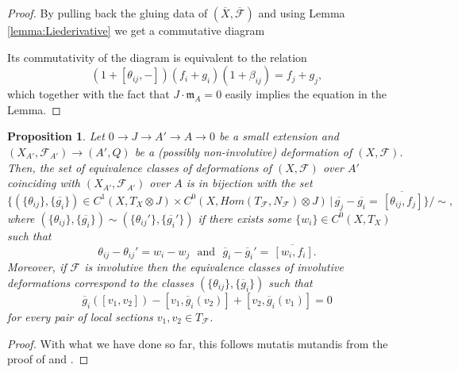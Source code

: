 \documentclass[reqno]{amsart}
\newcommand\m{\mathfrak{m}}
\newcommand{\T}{\mathbb{T}}
\newcommand{\F}{\mathscr{F}}
\newcounter{Theorem}
\newtheorem{proposition}[theorem]{Proposition}
\theoremstyle{definition}
\theoremstyle{named}
\begin{document}
\begin{proof}
By pulling back the gluing data of $(\overline{X},\overline{\F})$ and using  Lemma \ref{lemma:Liederivative} we get a commutative diagram
   
    \begin{center}\Large
    \end{center}
Its commutativity of the diagram is equivalent to the relation 
$$ (1+[\theta_{ij},-])(f_i+g_i)(1+\beta_{ij})=f_j+g_j,$$
which together with the fact that $J\cdot \m_A=0$ easily implies the equation in the Lemma.
\end{proof}




\begin{proposition} \label{prop:logdef}
    Let $0\rightarrow J\rightarrow A'\rightarrow A\rightarrow 0$ be a small extension and $(X_{A'},\F_{A'})\to (A',Q)$ be a (possibly non-involutive) deformation of $(X,\F)$. Then, the set of equivalence classes of deformations of $(X,\F)$ over $A'$ coinciding with $(X_{A'},\F_{A'})$ over $A$ is in bijection with the set
    $$ \Big\{(\{\theta_{ij}\},\{\overline{g_i}\})\in C^1(X,T_X\otimes J)\times C^0 (X,Hom(T_\F,N_\F)\otimes J)\,\Big\vert \,\overline{g_j}-\overline{g_i}= \overline{\, [\theta_{ij},f_j]}\Big\}\big/ \sim ,$$
    where $(\{\theta_{ij}\},\{\overline{g_i}\})\sim (\{\theta_{ij}'\},\{\overline{g_i}'\})$ if there exists some $\{w_i\}\in C^0(X,T_X)$ such that 
    $$ \theta_{ij}-\theta_{ij}'=w_i-w_j \,\, \mbox{ and }\,\, \overline{g}_i-\overline{g}_i'=\overline{\, [w_{i},f_i]}.$$
    Moreover, if $\F$ is involutive then the equivalence classes of involutive deformations correspond to the classes $(\{\theta_{ij}\},\{\overline{g}_i\})$ such that 
    $$ \overline{g}_i([v_1,v_2])-[v_1,\overline{g}_i(v_2)]+[v_2,\overline{g}_i(v_1)]=0$$
    for every pair of local sections $v_1,v_2\in T_\F$.
\end{proposition}
\begin{proof}
   With what we have done so far, this follows mutatis mutandis from the proof of \cite[Theorem 1.4]{gomez1988transverse} and \cite[Theorem 2.2]{gomez1988transverse}. 
\end{proof}
\end{document}
